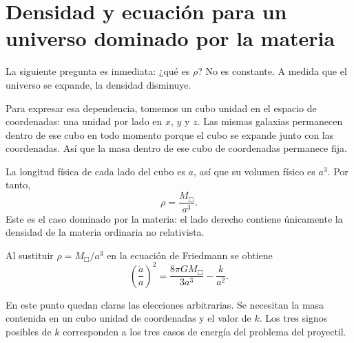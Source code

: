 \section{Densidad y ecuación para un universo dominado por la materia}

La siguiente pregunta es inmediata: ¿qué es \(\rho\)? No es constante. A medida que el universo se expande, la densidad disminuye.

Para expresar esa dependencia, tomemos un cubo unidad en el espacio de coordenadas: una unidad por lado en \(x\), \(y\) y \(z\). Las mismas galaxias permanecen dentro de ese cubo en todo momento porque el cubo se expande junto con las coordenadas. Así que la masa dentro de ese cubo de coordenadas permanece fija.


La longitud física de cada lado del cubo es \(a\), así que su volumen físico es \(a^3\). Por tanto,
\begin{equation}
\rho=\frac{M_{\Box}}{a^3}.
\end{equation}
Este es el caso dominado por la materia: el lado derecho contiene únicamente la densidad de la materia ordinaria no relativista.

\begin{classroomqa}
\end{classroomqa}

Al sustituir \(\rho=M_{\Box}/a^3\) en la ecuación de Friedmann se obtiene
\begin{equation}
\left(\frac{\dot a}{a}\right)^2=\frac{8\pi G M_{\Box}}{3a^3}-\frac{k}{a^2}.
\end{equation}

En este punto quedan claras las elecciones arbitrarias. Se necesitan la masa contenida en un cubo unidad de coordenadas y el valor de \(k\). Los tres signos posibles de \(k\) corresponden a los tres casos de energía del problema del proyectil.

